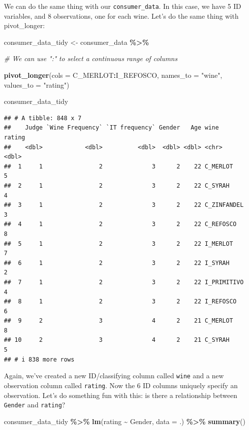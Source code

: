 \documentclass[
]{book}
\newenvironment{Shaded}{\begin{snugshade}}{\end{snugshade}}
\newcommand{\AttributeTok}[1]{\textcolor[rgb]{0.13,0.29,0.53}{#1}}
\newcommand{\CommentTok}[1]{\textcolor[rgb]{0.56,0.35,0.01}{\textit{#1}}}
\newcommand{\FunctionTok}[1]{\textcolor[rgb]{0.13,0.29,0.53}{\textbf{#1}}}
\newcommand{\NormalTok}[1]{#1}
\newcommand{\OtherTok}[1]{\textcolor[rgb]{0.56,0.35,0.01}{#1}}
\newcommand{\SpecialCharTok}[1]{\textcolor[rgb]{0.81,0.36,0.00}{\textbf{#1}}}
\newcommand{\StringTok}[1]{\textcolor[rgb]{0.31,0.60,0.02}{#1}}
\begin{document}
We can do the same thing with our \texttt{consumer\_data}. In this case, we have 5 ID variables, and 8 observations, one for each wine. Let's do the same thing with pivot\_longer:

\begin{Shaded}
\begin{Highlighting}[]
\NormalTok{consumer\_data\_tidy }\OtherTok{\textless{}{-}} 
\NormalTok{  consumer\_data }\SpecialCharTok{\%\textgreater{}\%}
  
\CommentTok{\# We can use ":" to select a continuous range of columns}
  
  \FunctionTok{pivot\_longer}\NormalTok{(}\AttributeTok{cols =}\NormalTok{ C\_MERLOT}\SpecialCharTok{:}\NormalTok{I\_REFOSCO,}
               \AttributeTok{names\_to =} \StringTok{"wine"}\NormalTok{,}
               \AttributeTok{values\_to =} \StringTok{"rating"}\NormalTok{)}

\NormalTok{consumer\_data\_tidy}
\end{Highlighting}
\end{Shaded}

\begin{verbatim}
## # A tibble: 848 x 7
##    Judge `Wine Frequency` `IT frequency` Gender   Age wine        rating
##    <dbl>            <dbl>          <dbl>  <dbl> <dbl> <chr>        <dbl>
##  1     1                2              3      2    22 C_MERLOT         5
##  2     1                2              3      2    22 C_SYRAH          4
##  3     1                2              3      2    22 C_ZINFANDEL      3
##  4     1                2              3      2    22 C_REFOSCO        8
##  5     1                2              3      2    22 I_MERLOT         7
##  6     1                2              3      2    22 I_SYRAH          2
##  7     1                2              3      2    22 I_PRIMITIVO      4
##  8     1                2              3      2    22 I_REFOSCO        6
##  9     2                3              4      2    21 C_MERLOT         8
## 10     2                3              4      2    21 C_SYRAH          5
## # i 838 more rows
\end{verbatim}

Again, we've created a new ID/classifying column called \texttt{wine} and a new observation column called \texttt{rating}. Now the 6 ID columns uniquely specify an observation. Let's do something fun with this: is there a relationship between \texttt{Gender} and \texttt{rating}?

\begin{Shaded}
\begin{Highlighting}[]
\NormalTok{consumer\_data\_tidy }\SpecialCharTok{\%\textgreater{}\%}
  \FunctionTok{lm}\NormalTok{(rating }\SpecialCharTok{\textasciitilde{}}\NormalTok{ Gender, }\AttributeTok{data =}\NormalTok{ .) }\SpecialCharTok{\%\textgreater{}\%}
  \FunctionTok{summary}\NormalTok{()}
\end{Highlighting}
\end{Shaded}
\end{document}
